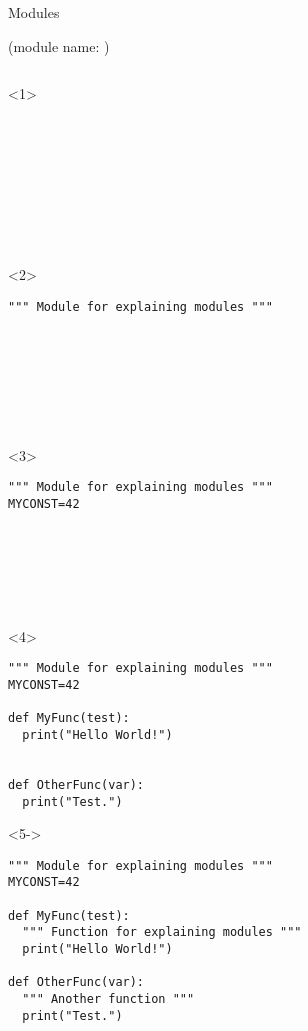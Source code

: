 \begin{frame}[fragile]{Modules}

   \hspace*{2cm} (module name: )

  \begin{columns}[onlytextwidth]
    \begin{column}{\textwidth}

      \begin{onlyenv}<1>
        \begin{lstlisting}[style=python]









 \end{lstlisting}
      \end{onlyenv}

      \begin{onlyenv}<2>
        \begin{lstlisting}[style=python]
""" Module for explaining modules """








 \end{lstlisting}
      \end{onlyenv}

      \begin{onlyenv}<3>
        \begin{lstlisting}[style=python]
""" Module for explaining modules """
MYCONST=42







 \end{lstlisting}
      \end{onlyenv}

      \begin{onlyenv}<4>
        \begin{lstlisting}[style=python]
""" Module for explaining modules """
MYCONST=42

def MyFunc(test):
  print("Hello World!")


def OtherFunc(var):
  print("Test.")
 \end{lstlisting}
      \end{onlyenv}

      \begin{onlyenv}<5->
        \begin{lstlisting}[style=python]
""" Module for explaining modules """
MYCONST=42

def MyFunc(test):
  """ Function for explaining modules """
  print("Hello World!")

def OtherFunc(var):
  """ Another function """
  print("Test.") \end{lstlisting}
      \end{onlyenv}

    \end{column}
  \end{columns}

\end{frame}


